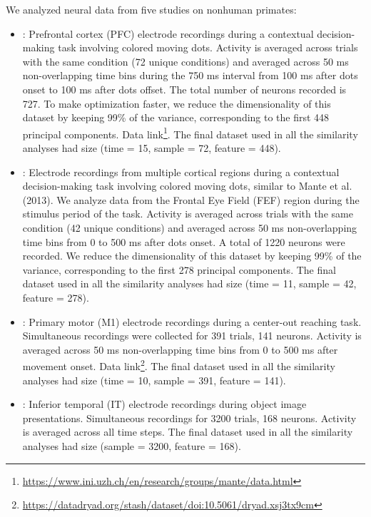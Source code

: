 \documentclass{article} %
\begin{document}
We analyzed neural data from five studies on nonhuman primates:
\begin{itemize}
    \item \citet{Mante2013}: Prefrontal cortex (PFC) electrode recordings during a contextual decision-making task involving colored moving dots. Activity is averaged across trials with the same condition (72 unique conditions) and averaged across 50 ms non-overlapping time bins during the 750 ms interval from 100 ms after dots onset to 100 ms after dots offset. The total number of neurons recorded is 727. To make optimization faster, we reduce the dimensionality of this dataset by keeping 99\% of the variance, corresponding to the first 448 principal components. Data link\footnote{ \url{https://www.ini.uzh.ch/en/research/groups/mante/data.html}}. The final dataset used in all the similarity analyses had size (time = 15, sample = 72, feature = 448).
    \item \citet{Siegel2015}: Electrode recordings from multiple cortical regions during a contextual decision-making task involving colored moving dots, similar to Mante et al. (2013). We analyze data from the Frontal Eye Field (FEF) region during the stimulus period of the task. Activity is averaged across trials with the same condition (42 unique conditions) and averaged across 50 ms non-overlapping time bins from 0 to 500 ms after dots onset. A total of 1220 neurons were recorded. We reduce the dimensionality of this dataset by keeping 99\% of the variance, corresponding to the first 278 principal components. The final dataset used in all the similarity analyses had size (time = 11, sample = 42, feature = 278).
    \item \citet{Hatsopoulos2007}: Primary motor (M1) electrode recordings during a center-out reaching task. Simultaneous recordings were collected for 391 trials, 141 neurons. Activity is averaged across 50 ms non-overlapping time bins from 0 to 500 ms after movement onset. Data link\footnote{\url{https://datadryad.org/stash/dataset/doi:10.5061/dryad.xsj3tx9cm}}. The final dataset used in all the similarity analyses had size (time = 10, sample = 391, feature = 141).
    \item \citet{MajajHong2015}: Inferior temporal (IT) electrode recordings during object image presentations. Simultaneous recordings for 3200 trials, 168 neurons. Activity is averaged across all time steps. The final dataset used in all the similarity analyses had size (sample = 3200, feature = 168).

\end{itemize}
\end{document}
